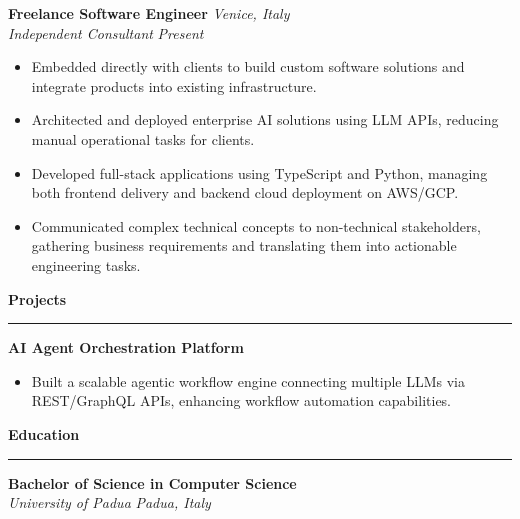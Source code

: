 \documentclass[11pt,a4paper]{article}
\begin{document}
\noindent\textbf{Freelance Software Engineer} \hfill \textit{Venice, Italy}\\
\textit{Independent Consultant} \hfill \textit{Present}
\begin{itemize}[leftmargin=*, nosep]
    \item Embedded directly with clients to build custom software solutions and integrate products into existing infrastructure.
    \item Architected and deployed enterprise AI solutions using LLM APIs, reducing manual operational tasks for clients.
    \item Developed full-stack applications using TypeScript and Python, managing both frontend delivery and backend cloud deployment on AWS/GCP.
    \item Communicated complex technical concepts to non-technical stakeholders, gathering business requirements and translating them into actionable engineering tasks.
\end{itemize}

\vspace{1em}

\noindent\textbf{\Large Projects}
\vspace{0.5em}\hrule\vspace{0.5em}
\noindent\textbf{AI Agent Orchestration Platform}
\begin{itemize}[leftmargin=*, nosep]
    \item Built a scalable agentic workflow engine connecting multiple LLMs via REST/GraphQL APIs, enhancing workflow automation capabilities.
\end{itemize}

\vspace{1em}

\noindent\textbf{\Large Education}
\vspace{0.5em}\hrule\vspace{0.5em}
\noindent\textbf{Bachelor of Science in Computer Science}\\
\textit{University of Padua} \hfill \textit{Padua, Italy}
\end{document}
